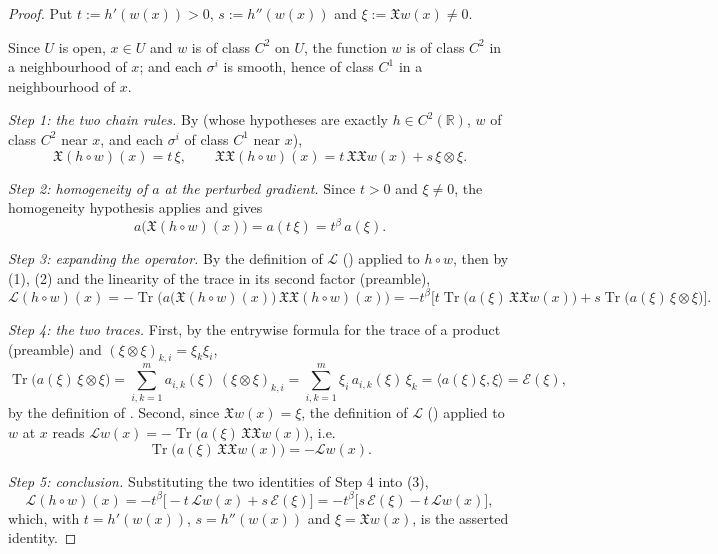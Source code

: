 \begin{proof}
Put $t:=h'(w(x))>0$, $s:=h''(w(x))$ and $\xi:=\mathfrak{X}w(x)\neq0$.

Since $U$ is open, $x\in U$ and $w$ is of class $C^2$ on $U$, the function $w$ is of class $C^2$ in
a neighbourhood of $x$; and each $\sigma^i$ is smooth, hence of class $C^1$ in a neighbourhood of
$x$.

\emph{Step 1: the two chain rules.} By  (whose hypotheses are exactly
$h\in C^2(\mathbb{R})$, $w$ of class $C^2$ near $x$, and each $\sigma^i$ of class $C^1$ near $x$),
\begin{equation*}\mathfrak{X}(h\circ w)(x)=t\,\xi,\qquad
\mathfrak{X}\mathfrak{X}(h\circ w)(x)=t\,\mathfrak{X}\mathfrak{X}w(x)+s\,\xi\otimes\xi. \tag{1}\end{equation*}

\emph{Step 2: homogeneity of $a$ at the perturbed gradient.} Since $t>0$ and $\xi\neq0$, the
homogeneity hypothesis applies and gives
\begin{equation*}a\big(\mathfrak{X}(h\circ w)(x)\big)=a(t\,\xi)=t^{\beta}\,a(\xi). \tag{2}\end{equation*}

\emph{Step 3: expanding the operator.} By the definition of $\mathcal{L}$
() applied to $h\circ w$, then by (1), (2) and the linearity of the trace in
its second factor (preamble),
\begin{equation*}\mathcal{L}(h\circ w)(x)
=-\operatorname{Tr}\Big(a\big(\mathfrak{X}(h\circ w)(x)\big)\,
\mathfrak{X}\mathfrak{X}(h\circ w)(x)\Big)
=-t^{\beta}\Big[t\operatorname{Tr}\big(a(\xi)\,\mathfrak{X}\mathfrak{X}w(x)\big)
+s\operatorname{Tr}\big(a(\xi)\,\xi\otimes\xi\big)\Big]. \tag{3}\end{equation*}

\emph{Step 4: the two traces.} First, by the entrywise formula for the trace of a product
(preamble) and $(\xi\otimes\xi)_{k,i}=\xi_k\xi_i$,
$$\operatorname{Tr}\big(a(\xi)\,\xi\otimes\xi\big)=\sum_{i,k=1}^m
a_{i,k}(\xi)\,(\xi\otimes\xi)_{k,i}=\sum_{i,k=1}^m\xi_i\,a_{i,k}(\xi)\,\xi_k
=\big\langle a(\xi)\xi,\xi\big\rangle=\mathcal{E}(\xi),$$
by the definition of . Second, since $\mathfrak{X}w(x)=\xi$, the definition
of $\mathcal{L}$ () applied to $w$ at $x$ reads
$\mathcal{L}w(x)=-\operatorname{Tr}\big(a(\xi)\,\mathfrak{X}\mathfrak{X}w(x)\big)$, i.e.
$$\operatorname{Tr}\big(a(\xi)\,\mathfrak{X}\mathfrak{X}w(x)\big)=-\mathcal{L}w(x).$$

\emph{Step 5: conclusion.} Substituting the two identities of Step 4 into (3),
$$\mathcal{L}(h\circ w)(x)=-t^{\beta}\big[-t\,\mathcal{L}w(x)+s\,\mathcal{E}(\xi)\big]
=-t^{\beta}\big[s\,\mathcal{E}(\xi)-t\,\mathcal{L}w(x)\big],$$
which, with $t=h'(w(x))$, $s=h''(w(x))$ and $\xi=\mathfrak{X}w(x)$, is the asserted identity.
\end{proof}
